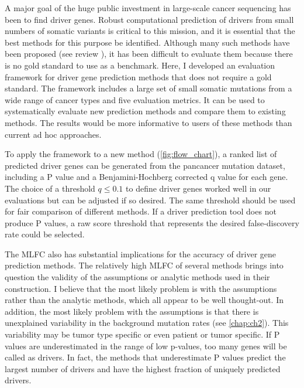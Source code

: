 A major goal of the huge public investment in large-scale cancer sequencing has been to find driver genes. Robust computational prediction of drivers from small numbers of somatic variants is critical to this mission, and it is essential that the best methods for this purpose be identified. Although many such methods have been proposed (see review \cite{RN49}), it has been difficult to evaluate them because there is no gold standard to use as a benchmark. Here, I developed an evaluation framework for driver gene prediction methods that does not require a gold standard. The framework includes a large set of small somatic mutations from a wide range of cancer types and five evaluation metrics. It can be used to systematically evaluate new prediction methods and compare them to existing methods. The results would be more informative to users of these methods than current ad hoc approaches.

To apply the framework to a new method (\autoref{fig:flow_chart}), a ranked list of predicted driver genes can be generated from the pancancer mutation dataset, including a P value and a Benjamini-Hochberg corrected q value for each gene. The choice of a threshold $q \leq 0.1$ to define driver genes worked well in our evaluations but can be adjusted if so desired. The same threshold should be used for fair comparison of different methods. If a driver prediction tool does not produce P values, a raw score threshold that represents the desired false-discovery rate could be selected.

The MLFC also has substantial implications for the accuracy of driver gene prediction methods. The relatively high MLFC of several methods brings into question the validity of the assumptions or analytic methods used in their construction. I believe that the most likely problem is with the assumptions rather than the analytic methods, which all appear to be well thought-out. In addition, the most likely problem with the assumptions is that there is unexplained variability in the background mutation rates (see \autoref{chap:ch2}). This variability may be tumor type specific or even patient or tumor specific. If P values are underestimated in the range of low p-values, too many genes will be called as drivers. In fact, the methods that underestimate P values predict the largest number of drivers and have the highest fraction of uniquely predicted drivers.


